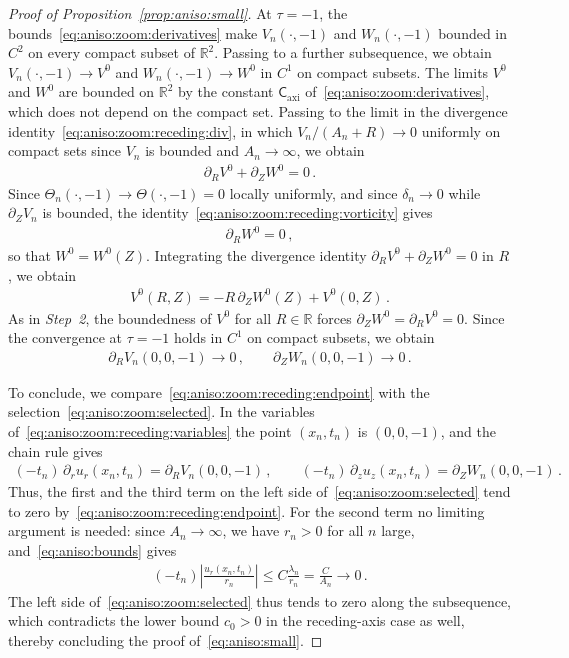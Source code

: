 \documentclass[11pt,reqno]{amsproc}
\numberwithin{equation}{section}
\theoremstyle{remark}
\newcommand{\p}{\partial}
\newcommand{\RR}{\mathbb R}
\newcommand{\Caxi}{\mathsf{C}_{\mathrm{axi}}}
\begin{document}
\begin{proof}[Proof of Proposition~\ref{prop:aniso:small}]
At $\tau=-1$, the bounds~\eqref{eq:aniso:zoom:derivatives} make $V_n(\cdot,-1)$ and $W_n(\cdot,-1)$ bounded in $C^2$ on every compact subset of $\RR^2$. Passing to a further subsequence, we obtain $V_n(\cdot,-1)\to V^0$ and $W_n(\cdot,-1)\to W^0$ in $C^1$ on compact subsets. The limits $V^0$ and $W^0$ are bounded on $\RR^2$ by the constant $\Caxi$ of~\eqref{eq:aniso:zoom:derivatives}, which does not depend on the compact set.
Passing to the limit in the divergence identity~\eqref{eq:aniso:zoom:receding:div}, in which $V_n/(A_n+R)\to0$ uniformly on compact sets since $V_n$ is bounded and $A_n\to\infty$, we obtain
\begin{align*}
\p_RV^0+\p_ZW^0=0
\,.
\end{align*}
Since $\Theta_n(\cdot,-1)\to\Theta(\cdot,-1)=0$ locally uniformly, and since $\delta_n\to0$ while $\p_ZV_n$ is bounded, the identity~\eqref{eq:aniso:zoom:receding:vorticity} gives
\begin{align*}
\p_RW^0=0
\,,
\end{align*}
so that $W^0=W^0(Z)$. Integrating the divergence identity $\p_RV^0+\p_ZW^0=0$ in $R$, we obtain
\begin{align*}
V^0(R,Z)=-R\,\p_ZW^0(Z)+V^0(0,Z) \,.
\end{align*}
As in \emph{Step~2}, the boundedness of $V^0$ for all $R\in\RR$ forces $\p_ZW^0=\p_RV^0=0$. Since the convergence at $\tau=-1$ holds in $C^1$ on compact subsets, we obtain
\begin{align}
\p_RV_n(0,0,-1)\to 0
\,,\qquad
\p_ZW_n(0,0,-1)\to 0
\,.
\label{eq:aniso:zoom:receding:endpoint}
\end{align}

To conclude, we compare~\eqref{eq:aniso:zoom:receding:endpoint} with the selection~\eqref{eq:aniso:zoom:selected}. In the variables of~\eqref{eq:aniso:zoom:receding:variables} the point $(x_n,t_n)$ is $(0,0,-1)$, and the chain rule gives
\begin{align*}
(-t_n)\,\p_ru_r(x_n,t_n)=\p_RV_n(0,0,-1)
\,,\qquad
(-t_n)\,\p_zu_z(x_n,t_n)=\p_ZW_n(0,0,-1)
\,.
\end{align*}
Thus, the first and the third term on the left side of~\eqref{eq:aniso:zoom:selected} tend to zero by~\eqref{eq:aniso:zoom:receding:endpoint}. For the second term no limiting argument is needed: since $A_n\to\infty$, we have $r_n>0$ for all $n$ large, and~\eqref{eq:aniso:bounds} gives
\begin{align}
(-t_n)\left|\frac{u_r(x_n,t_n)}{r_n}\right|
\le C\frac{\lambda_n}{r_n}=\frac{C}{A_n}\to0
\,.
\label{eq:aniso:zoom:receding:quotient}
\end{align}
The left side of~\eqref{eq:aniso:zoom:selected} thus tends to zero along the subsequence, which contradicts the lower bound $c_0>0$ in the receding-axis case as well, thereby concluding the proof of~\eqref{eq:aniso:small}.
\end{proof}
\end{document}
